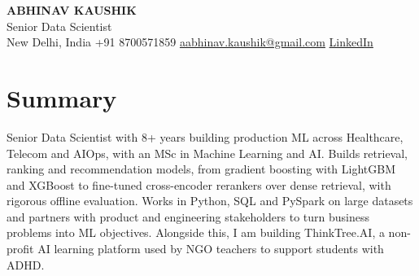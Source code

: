 \documentclass[10pt,a4paper]{article}
\begin{document}
\begin{center}
  {\LARGE\bfseries ABHINAV KAUSHIK}\\[2pt]
  {\large Senior Data Scientist}\\[2pt]
  New Delhi, India \textbar{} +91 8700571859 \textbar{} \href{mailto:aabhinav.kaushik@gmail.com}{aabhinav.kaushik@gmail.com} \textbar{} \href{https://www.linkedin.com/in/abhinav-kaushik10/}{LinkedIn}  
\end{center}

\section{Summary}
Senior Data Scientist with 8+ years building production ML across Healthcare, Telecom and AIOps, with an MSc in Machine Learning and AI. Builds retrieval, ranking and recommendation models, from gradient boosting with LightGBM and XGBoost to fine-tuned cross-encoder rerankers over dense retrieval, with rigorous offline evaluation. Works in Python, SQL and PySpark on large datasets and partners with product and engineering stakeholders to turn business problems into ML objectives. Alongside this, I am building ThinkTree.AI, a non-profit AI learning platform used by NGO teachers to support students with ADHD.
\end{document}
